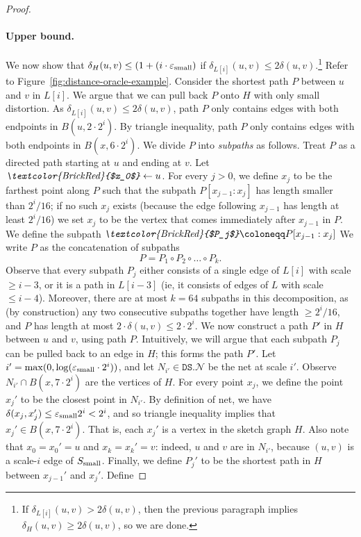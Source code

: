 \documentclass[11pt]{article}
\let\e\varepsilon               %
\def\EMPH#1{\emph{\textcolor{BrickRed} {#1}}}
\newcommand{\cN}{\mathcal{N}}
\newcommand{\dist}{\ensuremath{\delta}}
\newcommand{\DS}{\texttt{DS}}
\newcommand{\net}{{\ensuremath{\DS.\cN}}}
\begin{document}
\begin{proof}
    \paragraph{Upper bound.} We now show that $\dist_H(u,v) \le (1+(i \cdot \e_{\rm small})$ if $\dist_{L[i]}(u,v) \le 2 \dist(u,v)$.\footnote{If $\dist_{L[i]}(u,v) > 2 \dist(u,v)$, then the previous paragraph implies $\dist_H(u,v) \ge 2 \dist(u,v)$, so we are
    done.
    }
    Refer to Figure~\ref{fig:distance-oracle-example}. Consider the shortest path $P$ between $u$ and $v$ in $L[i]$. We argue that we can pull back $P$ onto $H$ with only small distortion. As $\dist_{L[i]}(u,v) \le 2 \dist(u,v)$, path $P$ only contains edges with both endpoints in $B(u, 2 \cdot 2^i)$. By triangle inequality, path $P$ only contains edges with both endpoints in $B(x, 6 \cdot 2^i)$. 
We divide $P$ into \EMPH{subpaths} as follows. Treat $P$ as a directed path starting at $u$ and ending at $v$. Let $\EMPH{$x_0$} \gets u$. For every $j > 0$, we define \EMPH{$x_j$} to be the farthest point along $P$ such that the subpath $P[x_{j-1}:x_j]$ has length smaller than $2^i / 16$; if no such $x_j$ exists (because the edge following $x_{j-1}$ has length at least $2^i / 16$) we set $x_j$ to be the vertex that comes immediately after $x_{j-1}$ in $P$.  We define the subpath $\EMPH{$P_j$} \coloneqq P[x_{j-1}:x_j]$
We write $P$ as the concatenation of subpaths
\[P = P_1 \circ P_2 \circ \ldots \circ P_k.\]
Observe that every subpath $P_j$ either consists of a single edge of $L[i]$ with scale $\ge i - 3$, or it is a path in $L[i-3]$ (ie, it consists of edges of $L$ with scale $\le i-4$). Moreover, there are at most $k = 64$ subpaths in this decomposition, as (by construction) any two consecutive subpaths together have length $\ge 2^i / 16$, and $P$ has length at most $2 \cdot \dist(u,v) \le 2 \cdot 2^i$.
%
We now construct a path $P'$ in $H$ between $u$ and $v$, using path $P$. Intuitively, we will argue that each subpath $P_j$ can be pulled back to an edge in $H$; this forms the path $P'$. Let $i' = \max(0, \log(\e_{\rm small}\cdot 2^i))$, and let $N_{i'} \in \net$ be the net at scale $i'$. Observe $N_{i'} \cap B(x, 7\cdot 2^i)$ are the vertices of $H$. For every point $x_j$, we define the point \EMPH{$x_j'$} to be the closest point in $N_{i'}$. By definition of net, we have $\dist(x_j,x_j') \le \e_{\rm small} 2^i < 2^i$, and so triangle inequality implies that $x_j' \in B(x, 7 \cdot 2^i)$. That is, each $x_j'$ is a vertex in the sketch graph $H$. Also note that $x_0 = x_0' = u$ and $x_k = x_k' = v$: indeed, $u$ and $v$ are in $N_{i'}$, because $(u,v)$ is a scale-$i$ edge of $S_{\rm small}$.  Finally, we define \EMPH{$P_j'$} to be the shortest path in $H$ between $x_{j-1}'$ and $x_j'$. Define

\end{proof}
\end{document}
